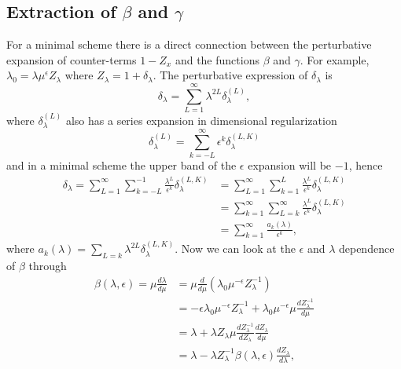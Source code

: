 \subsection{Extraction of \texorpdfstring{$\beta$}{beta} and \texorpdfstring{$\gamma$}{gamma}}
For a minimal scheme there is a direct connection between the perturbative expansion of counter-terms $1 - Z_x$ and the functions $\beta$ and $\gamma$. For example, $\lambda_0 = \lambda\mu^\epsilon Z_\lambda$ where $Z_\lambda = 1 + \delta_\lambda$. The perturbative expression of $\delta_\lambda$ is 
\begin{equation}
    \delta_\lambda = \sum_{L=1}^\infty\lambda^{2L}\delta_\lambda^{(L)},    
\end{equation}
where $\delta_\lambda^{(L)}$ also has a series expansion in dimensional regularization 
\begin{equation}
    \delta_\lambda^{(L)} = \sum_{k=-L}^\infty\epsilon^k\delta_{\lambda}^{(L,K)}
\end{equation}
and in a minimal scheme the upper band of the $\epsilon$ expansion will be $-1$, hence
\begin{equation}
    \begin{split}
        \delta_\lambda = \sum_{L=1}^\infty\sum_{k=-L}^{-1}\frac{\lambda^L}{\epsilon^k}\delta_\lambda^{(L,K)} &= \sum_{L=1}^{\infty}\sum_{k=1}^{L}\frac{\lambda^L}{\epsilon^k}\delta_\lambda^{(L,K)} \\
        &=\sum_{k=1}^{\infty}\sum_{L=k}^{\infty}\frac{\lambda^L}{\epsilon^k}\delta_\lambda^{(L,K)} \\
        &= \sum_{k=1}^\infty\frac{a_k(\lambda)}{\epsilon^k},
    \end{split}
\end{equation}
where $a_k(\lambda) = \sum_{L=k}\lambda^{2L}\delta_\lambda^{(L,K)}$. Now we can look at the $\epsilon$ and $\lambda$ dependence of $\beta$ through
\begin{equation}
    \begin{split}
        \beta(\lambda,\epsilon) = \mu\frac{d\lambda}{d\mu} &= \mu\frac{d}{d\mu}(\lambda_0\mu^{-\epsilon}Z_\lambda^{-1}) \\
        &= -\epsilon\lambda_0\mu^{-\epsilon}Z_\lambda^{-1} + \lambda_0\mu^{-\epsilon}\mu\frac{dZ_\lambda^{-1}}{d\mu} \\
        &= \lambda + \lambda Z_\lambda\mu\frac{dZ_\lambda^{-1}}{dZ_\lambda}\frac{dZ_\lambda}{d\mu} \\
        &= \lambda - \lambda Z_\lambda^{-1}\beta(\lambda,\epsilon)\frac{dZ_\lambda}{d\lambda},
    \end{split}
\end{equation}
